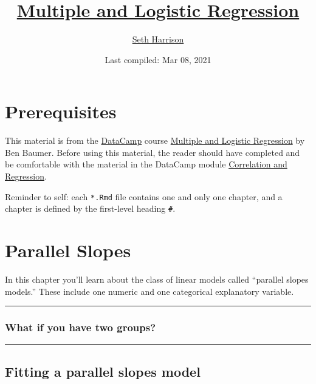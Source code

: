 \documentclass[
]{book}
\title{\href{https://www.datacamp.com/courses/multiple-and-logistic-regression}{Multiple and Logistic Regression}}
\author{\href{https://your_username.github.io/}{Seth Harrison}}
\date{Last compiled: Mar 08, 2021}
\begin{document}
\maketitle

{
\setcounter{tocdepth}{1}
\tableofcontents
}
\hypertarget{prerequisites}{%
\chapter{Prerequisites}\label{prerequisites}}

This material is from the \href{https://www.datacamp.com}{DataCamp} course \href{https://www.datacamp.com/courses/multiple-and-logistic-regression}{Multiple and Logistic Regression} by Ben Baumer. Before using this material, the reader should have completed and be comfortable with the material in the DataCamp module \href{https://www.datacamp.com/courses/correlation-and-regression}{Correlation and Regression}.

Reminder to self: each \texttt{*.Rmd} file contains one and only one chapter, and a chapter is defined by the first-level heading \texttt{\#}.

\hypertarget{parallel-slopes}{%
\chapter{Parallel Slopes}\label{parallel-slopes}}

In this chapter you'll learn about the class of linear models called ``parallel slopes models.'' These include one numeric and one categorical explanatory variable.

\begin{center}\rule{0.5\linewidth}{0.5pt}\end{center}

\hypertarget{what-if-you-have-two-groups}{%
\subsection*{What if you have two groups?}\label{what-if-you-have-two-groups}}

\begin{center}\rule{0.5\linewidth}{0.5pt}\end{center}

\hypertarget{fitting-a-parallel-slopes-model}{%
\section{Fitting a parallel slopes model}\label{fitting-a-parallel-slopes-model}}
\end{document}
